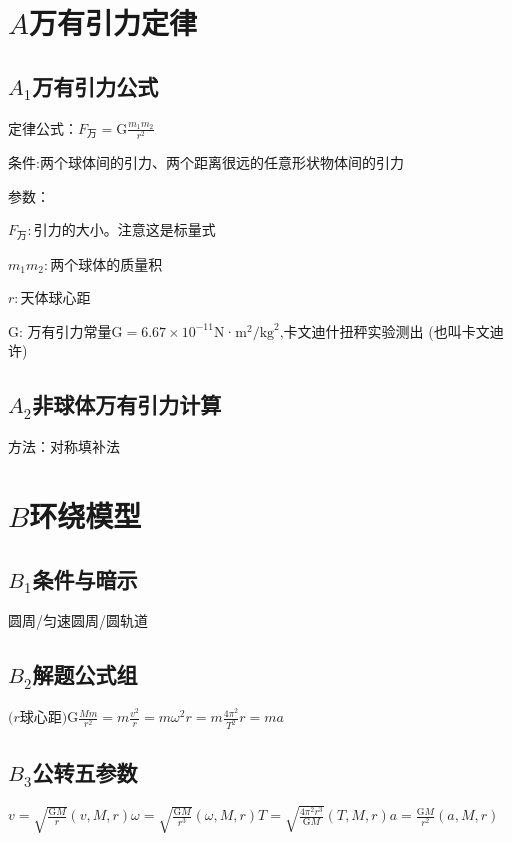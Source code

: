 \documentclass[lang=cn,10pt]{elegantbook}
\begin{document}
	         \section{$A$万有引力定律}
	         \subsection{$A_1$万有引力公式}
	         定律公式：$F_{\text{万}}=\text{G}\frac{m_1m_2}{r^2}$
	         
	        $\text{条件:两个球体间的引力、两个距离很远的任意形状物体间的引力}$ 
	        
	        参数：
	        
	        $F_{\text{万}}:\text{引力的大小。注意这是标量式}$
	        
	        $m_1m_2:$两个球体的质量积
	        
	        $r:$天体球心距
	        
	        
	        G: 万有引力常量G$=6.67\times10^{-11}$N·m$^2/\mathrm{kg}^2$,卡文迪什扭秤实验测出
	        (也叫卡文迪许)
	        
	        \subsection{$A_2$非球体万有引力计算}
	        
	        方法：对称填补法
	        \vspace{3cm}
	        
	        \section{$B$环绕模型}
	        \subsection{$B_1$条件与暗示}
	        
	        圆周/匀速圆周/圆轨道
	        
	        \subsection{$B_2$解题公式组}
	        $ (r\text{球心距)G}\frac{Mm}{r^2}=m\frac{v^2}r=m\omega^2r=m\frac{4\pi^2}{T^2}r=ma$
	        \subsection{$B_3$公转五参数}
	       $ v=\sqrt{\frac{\mathrm{G}M}{r}}\left(v,M,r\right) \omega=\sqrt{\frac{\mathrm{G}M}{r^{3}}} \left(\omega,M,r\right) T=\sqrt{\frac{4\pi^{2}r^{3}}{\mathrm{G}M}}\left(T,M,r\right) a=\frac{\mathrm{G}M}{r^{2}}\left(a,M,r\right)$
\end{document}
